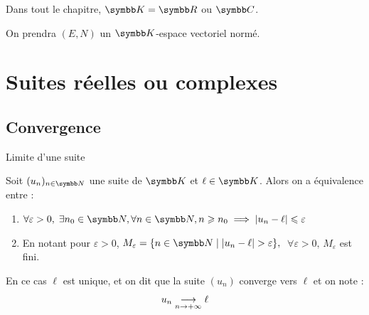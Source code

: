 
Dans tout le chapitre, $\K = \R$ ou $\C$.

On prendra $(E, N)$ un $\K$-espace vectoriel normé.

\section{Suites réelles ou complexes}
\subsection{Convergence}

\begin{definition}{Limite d'une suite}{}

    Soit $(u_n)_{n\in\N}$ une suite de $\K$ et $\ell \in \K$. Alors on a équivalence entre : 

    \begin{enumerate}[label=(\roman*)]
        \item $\forall \varepsilon > 0, \; \exists n_0 \in \N, \forall n \in \N, n \geqslant n_0 \implies |u_n - \ell| \leqslant \varepsilon$

        \item En notant pour $\varepsilon > 0$, $M_\varepsilon = \{n \in \N \mid |u_n - \ell| > \varepsilon\},$ 
        $\; \forall \varepsilon > 0, \, M_\varepsilon$ est fini.
    \end{enumerate}
    

    En ce cas $\ell$ est unique, et on dit que la suite $(u_n)$ converge vers $\ell$ et on note  :
    \[u_n \underset{n \to +\infty}{\longrightarrow} \ell\]
\end{definition}


